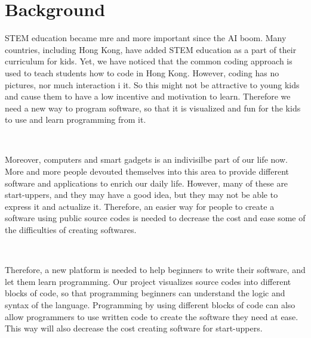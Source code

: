 \chapter{Background}
STEM education became mre and more important since the AI boom. Many countries, including Hong Kong, have added STEM education as a part of their curriculum for kids. Yet, we have noticed that the common coding approach is used to teach students how to code in Hong Kong. However, coding has no pictures, nor much interaction i it. So this might not be attractive to young kids and cause them to have a low incentive and motivation to learn. Therefore we need a new way to program software, so that it is visualized and fun for the kids to use and learn programming from it. \par~

Moreover, computers and smart gadgets is an indivisilbe part of our life now. More and more people devouted themselves into this area to provide different software and applications to enrich our daily life. However, many of these are start-uppers, and they may have a good idea, but they may not be able to express it and actualize it. Therefore, an easier way for people to create a software using public source codes is needed to decrease the cost and ease some of the difficulties of creating softwares. \par~

Therefore, a new platform is needed to help beginners to write their software, and let them learn programming. Our project visualizes source codes into different blocks of code, so that programming beginners can understand the logic and syntax of the language. Programming by using different blocks of code can also allow programmers to use written code to create the software they need at ease. This way will also decrease the cost creating software for start-uppers.
